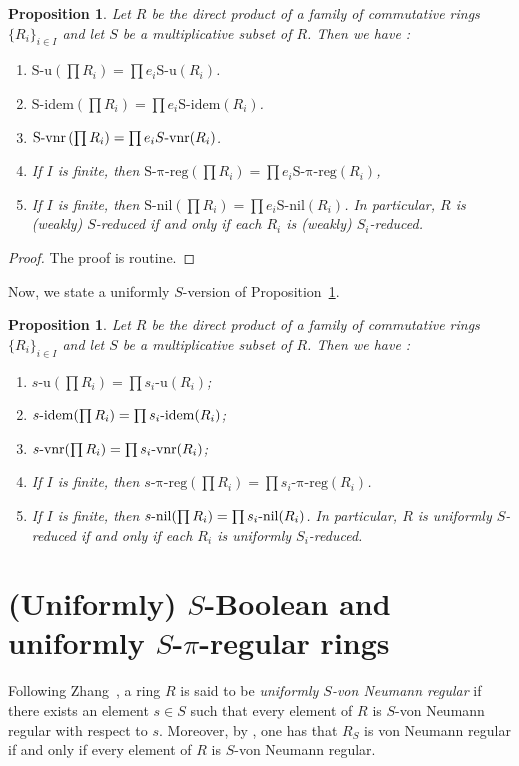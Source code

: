 \documentclass[12pt]{article}
\newtheorem{prop}[thm]{\bf Proposition}
\def\Sidem{\mathrm{S\text{-}idem}}
\def\Snil{\mathrm{S\text{-}nil}}
\def\Su{\mathrm{S\text{-}u}}
\def\Svnr{\mathrm{S\text{-}vnr}}
\def\Spreg{\mathrm{S\text{-}\pi\text{-}reg}}
\def\preg{\mathrm{\pi\text{-}reg}}
\def\u{\mathrm{u}}
\def\idem{{\rm idem}}
\def\nil{{\rm nil}}
\def\vnr{{\rm vnr}}
\begin{document}
\begin{prop}\label{prop-product-change-result} 
Let $R$ be the direct product of a family of commutative rings $\{R_i\}_{i\in I}$ and let $S$ be a multiplicative subset of $R$.  Then we have : 
\begin{enumerate}
\item $\Su\left(\prod R_i\right) = \prod e_i\Su(R_i)$. 
\item $\Sidem\left(\prod R_i\right) = \prod e_i\Sidem(R_i)$. 
\item $\Svnr\left(\prod R_i\right) = \prod e_iS\text{-}\vnr(R_i)$. 
\item If $I$ is finite, then $\Spreg\left(\prod R_i\right) = \prod e_i\Spreg(R_i)$,
\item If $I$ is finite, then $\Snil\left(\prod R_i\right) = \prod e_i\Snil(R_i)$. In particular, $R$ is (weakly) $S$-reduced if and only if each $R_i$ is (weakly) $S_i$-reduced.
\end{enumerate}
\end{prop}

\begin{proof}
The proof is routine. 
\end{proof}   
Now, we state a uniformly \( S \)-version of Proposition~\ref{prop-product-change-result}.
\begin{prop}\label{prop-product-change-uni-result}
Let $R$ be the direct product of a family of commutative rings $\{R_i\}_{i\in I}$ and let $S$ be a multiplicative subset of $R$. Then we have :
\begin{enumerate}
\item $s\text{-}\u(\prod R_i)= \prod s_i\text{-}\u(R_i)$;        
\item $s\text{-}\idem(\prod R_i)= \prod s_i\text{-}\idem(R_i)$; 
\item $s\text{-}\vnr(\prod R_i)= \prod s_i\text{-}\vnr(R_i)$; 
\item If $I$ is finite, then $s\text{-}\preg(\prod R_i)= \prod s_i\text{-}\preg(R_i)$.
\item If $I$ is finite, then $s\text{-}\nil(\prod R_i)= \prod s_i\text{-}\nil(R_i)$. In particular, $R$ is uniformly $S$-reduced if and only if each $R_i$ is uniformly $S_i$-reduced.
\end{enumerate}
\end{prop}
\section{\texorpdfstring{(Uniformly) $S$-Boolean  and uniformly $S$-$\pi$-regular rings}{(Uniformly) S-Boolean and uniformly S-pi-regular rings}} Following Zhang~\cite{Zha1}, a ring $R$ is said to be \emph{uniformly $S$-von Neumann regular} if there exists an element $s \in S$ such that every element of $R$ is $S$-von Neumann regular with respect to $s$. Moreover, by \cite[Proposition~3.10]{Zha1}, one has that $R_S$ is von Neumann regular if and only if every element of $R$ is $S$-von Neumann regular. 
\end{document}
